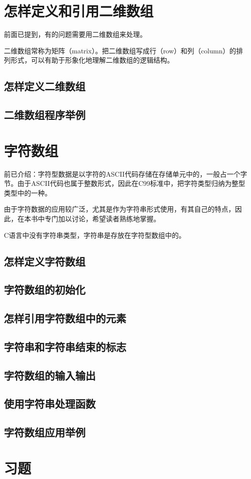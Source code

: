 \section{怎样定义和引用二维数组}
前面已提到，有的问题需要用二维数组来处理。

二维数组常称为矩阵（matrix）。把二维数组写成行（row）和列（column）的排列形式，可以有助于形象化地理解二维数组的逻辑结构。
\subsection{怎样定义二维数组}
\subsection{二维数组程序举例}
\section{字符数组}
前已介绍：字符型数据是以字符的ASCII代码存储在存储单元中的，一般占一个字节。由于ASCII代码也属于整数形式，因此在C99标准中，把字符类型归纳为整型类型中的一种。

由于字符数据的应用较广泛，尤其是作为字符串形式使用，有其自己的特点，因此，在本书中专门加以讨论，希望读者熟练地掌握。

C语言中没有字符串类型，字符串是存放在字符型数组中的。
\subsection{怎样定义字符数组}
\subsection{字符数组的初始化}
\subsection{怎样引用字符数组中的元素}
\subsection{字符串和字符串结束的标志}
\subsection{字符数组的输入输出}
\subsection{使用字符串处理函数}
\subsection{字符数组应用举例}
\section{习题}
